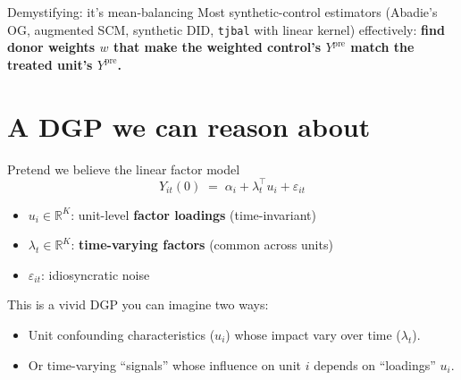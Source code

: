 \documentclass[xcolor=dvipsnames]{beamer}
\newcommand\makegaps{\addtolength{\itemsep}{.25\baselineskip}}
\newcommand{\Ypre}{Y^{\text{pre}}}        %
\begin{document}
\begin{frame}{Demystifying: it's mean-balancing}
Most synthetic-control estimators (Abadie's OG, augmented SCM, synthetic DID, \texttt{tjbal} with linear kernel) effectively: \textbf{find donor weights $w$ that make the weighted control's $\Ypre$ match the treated unit's $\Ypre$.}\\[2ex]
\end{frame}

\section{A DGP we can reason about}

\begin{frame}{Pretend we believe the linear factor model}
\[
Y_{it}(0) \;=\; \alpha_i + \lambda_t^\top u_i + \varepsilon_{it}
\]
\small

\begin{itemize}\makegaps
  \item<2-> $u_i \in \mathbb{R}^K$: unit-level \textbf{factor loadings} (time-invariant)
  \item<3-> $\lambda_t \in \mathbb{R}^K$: \textbf{time-varying factors} (common across units)
  \item<4-> $\varepsilon_{it}$: idiosyncratic noise
\end{itemize}
\bigskip
\normalsize
{} This is a vivid DGP you can imagine two ways:\\

\small
\begin{itemize}
\item Unit confounding characteristics ($u_i$) whose impact vary over time ($\lambda_t$).
\item Or time-varying ``signals'' whose influence on unit $i$ depends on ``loadings'' $u_i$.
\end{itemize}
\end{frame}
\end{document}
